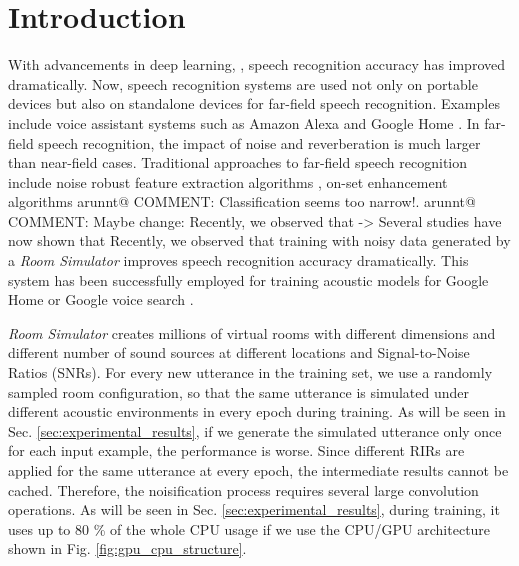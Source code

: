 \documentclass{article}
\makeatletter
\newcommand{\AR}[1]{{\color{red} arunnt@ COMMENT: #1}}
\makeatother
\begin{document}
\section{Introduction}
With advancements in deep learning,
\cite{Seltzer2013DNNAurora4, Yu2013FeatureLearningDNN, V_Vanhoucke_Deep_Learning_NIPS_Workshop_2011,
G_Hinton_IEEE_Signal_Process_Mag_2012,
T_Sainath_IEEETran_2017_1, T_Sainath_Book_Chapter_2017_1},
speech recognition accuracy has improved dramatically.
Now, speech recognition systems
are used not only on portable devices
but also on standalone devices for far-field speech recognition.
Examples include voice assistant systems such as Amazon Alexa
and Google Home \cite{C_Kim_INTERSPEECH_2017_1, B_Li_INTERSPEECH_2017_1}.
In far-field speech recognition, the impact of noise and reverberation
is much larger than near-field cases. Traditional approaches to far-field
speech recognition include noise robust feature extraction algorithms
\cite{C_Kim_IEEETran_2016_1, U_H_Yapanel_SpeechComm_2008},
on-set enhancement algorithms
\cite{C_Kim_INTERSPEECH_2010_2, C_Kim_INTERSPEECH_2014_2} \AR{Classification seems too narrow!}.
\AR{Maybe change: Recently, we observed that -> Several studies have now shown that} Recently, we observed that training with noisy data generated
by a \textit{Room Simulator} \cite{C_Kim_INTERSPEECH_2017_1}
improves speech recognition accuracy dramatically.
This system has been successfully employed
for training acoustic models for Google Home or Google voice
search \cite{C_Kim_INTERSPEECH_2017_1}.

\textit{Room Simulator} creates millions of virtual rooms
with different dimensions and different number of sound sources
at different locations and Signal-to-Noise Ratios (SNRs).
For every new utterance in the training set, we use a randomly
sampled room configuration, so that the same utterance
is simulated under different acoustic environments in every epoch during training.
As will be seen in Sec. \ref{sec:experimental_results}, if
we generate the simulated utterance only once for each
input example, the performance is worse.
Since different RIRs are applied for the same
utterance at every epoch, the intermediate results cannot be cached.
Therefore, the noisification process requires several large convolution operations. As will be seen
in Sec. \ref{sec:experimental_results}, during training, it uses up to 80 \%
of the whole CPU usage if we use the CPU/GPU architecture
shown in Fig. \ref{fig:gpu_cpu_structure}.
\end{document}
